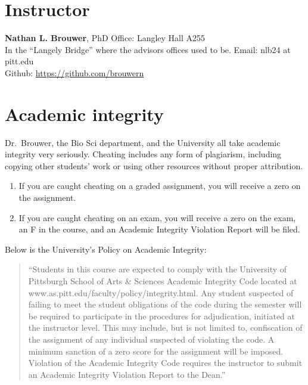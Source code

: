 \documentclass[
]{book}
\providecommand{\tightlist}{%
  \setlength{\itemsep}{0pt}\setlength{\parskip}{0pt}}
\begin{document}
\hypertarget{nlb}{%
\chapter{Instructor}\label{nlb}}

\textbf{Nathan L. Brouwer}, PhD
Office: Langley Hall A255\\
In the ``Langely Bridge'' where the advisors offices used to be.
Email: nlb24 at pitt.edu\\
Github: \url{https://github.com/brouwern}

\hypertarget{academic-integrity}{%
\chapter{Academic integrity}\label{academic-integrity}}

Dr.~Brouwer, the Bio Sci department, and the University all take academic integrity very seriously. Cheating includes any form of plagiarism, including copying other students' work or using other resources without proper attribution.

\begin{enumerate}
\def\labelenumi{\arabic{enumi}.}
\tightlist
\item
  If you are caught cheating on a graded assignment, you will receive a zero on the assignment.
\item
  If you are caught cheating on an exam, you will receive a zero on the exam, an F in the course, and an Academic Integrity Violation Report will be filed.
\end{enumerate}

Below is the University's Policy on Academic Integrity:

\begin{quote}
``Students in this course are expected to comply with the University of Pittsburgh School of Arts \& Sciences Academic Integrity Code located at www.as.pitt.edu/faculty/policy/integrity.html. Any student suspected of failing to meet the student obligations of the code during the semester will be required to participate in the procedures for adjudication, initiated at the instructor level. This may include, but is not limited to, confiscation of the assignment of any individual suspected of violating the code. A minimum sanction of a zero score for the assignment will be imposed. Violation of the Academic Integrity Code requires the instructor to submit an Academic Integrity Violation Report to the Dean.''
\end{quote}
\end{document}
